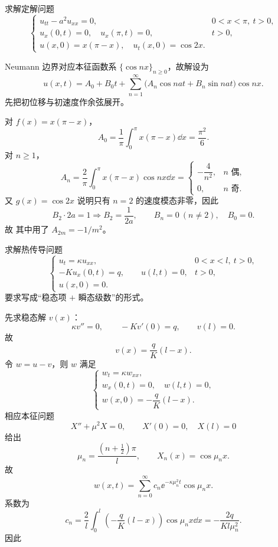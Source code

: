\begin{question}
求解定解问题
\[
\begin{cases}
 u_{tt}-a^2u_{xx}=0, & 0<x<\pi,\ t>0,\\
 u_x(0,t)=0,\quad u_x(\pi,t)=0, & t>0,\\
 u(x,0)=x(\pi-x),\quad u_t(x,0)=\cos 2x.
\end{cases}
\]

\begin{solution}

Neumann 边界对应本征函数系 $\{\cos nx\}_{n\ge0}$，故解设为
\[
u(x,t)=A_0+B_0t+\sum_{n=1}^{\infty}\bigl(A_n\cos nat+B_n\sin nat\bigr)\cos nx.
\]
先把初位移与初速度作余弦展开。

对 $f(x)=x(\pi-x)$，
\[
A_0=\frac1\pi\int_0^{\pi}x(\pi-x)\dd{x}=\frac{\pi^2}{6}.
\]
对 $n\ge1$，
\[
A_n=\frac{2}{\pi}\int_0^{\pi}x(\pi-x)\cos nx\dd{x}
=\begin{cases}
-\dfrac{4}{n^2},& n\text{ 偶},\\[0.3em]
0,& n\text{ 奇}.
\end{cases}
\]
又 $g(x)=\cos2x$ 说明只有 $n=2$ 的速度模态非零，因此
\[
B_2\cdot 2a=1\Longrightarrow B_2=\frac1{2a},\qquad B_n=0\ (n\ne2),\quad B_0=0.
\]
故
其中用了 $A_{2m}=-1/m^2$。
\end{solution}
\end{question}

\begin{question}
求解热传导问题
\[
\begin{cases}
 u_t=\kappa u_{xx}, & 0<x<l,\ t>0,\\
 -K u_x(0,t)=q,\qquad u(l,t)=0, & t>0,\\
 u(x,0)=0.
\end{cases}
\]
要求写成“稳态项 $+$ 瞬态级数”的形式。
\begin{solution}

先求稳态解 $v(x)$：
\[
\kappa v''=0,
\qquad -K v'(0)=q,
\qquad v(l)=0.
\]
故
\[
 v(x)=\frac{q}{K}(l-x).
\]
令 $w=u-v$，则 $w$ 满足
\[
\begin{cases}
 w_t=\kappa w_{xx},\\
 w_x(0,t)=0,\quad w(l,t)=0,\\
 w(x,0)=-\dfrac{q}{K}(l-x).
\end{cases}
\]
相应本征问题
\[
X''+\mu^2X=0,
\qquad X'(0)=0,
\quad X(l)=0
\]
给出
\[
\mu_n=\frac{(n+\tfrac12)\pi}{l},\qquad X_n(x)=\cos\mu_n x.
\]
故
\[
 w(x,t)=\sum_{n=0}^{\infty}c_n \ee^{-\kappa\mu_n^2 t}\cos\mu_n x.
\]
系数为
\[
 c_n=\frac{2}{l}\int_0^l\left(-\frac{q}{K}(l-x)\right)\cos\mu_n x\dd{x}
 =-\frac{2q}{Kl\mu_n^2}.
\]
因此
\end{solution}
\end{question}

